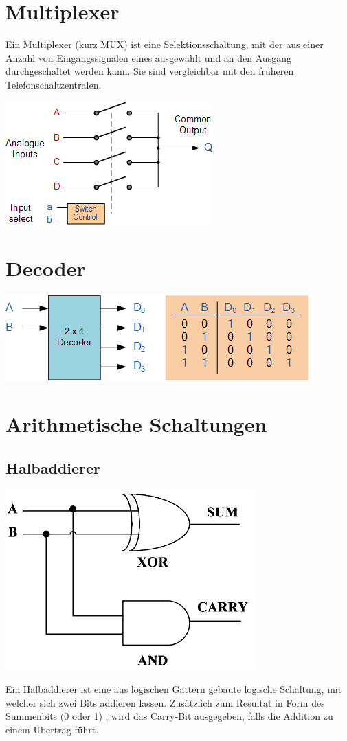 \documentclass[a4paper,10pt]{report}
\begin{document}
\section{Multiplexer}
Ein Multiplexer (kurz MUX) ist eine Selektionsschaltung, mit der aus einer Anzahl von Eingangssignalen eines ausgewählt und an den Ausgang durchgeschaltet werden kann. Sie sind vergleichbar mit den früheren Telefonschaltzentralen.
\begin{center}
\includegraphics[scale=0.9]{imgs/MUX.png}
\end{center}
\section{Decoder}
\begin{center}
\includegraphics[scale=0.75]{imgs/decoder.png}
\end{center}
\section{Arithmetische Schaltungen}
\subsection{Halbaddierer}
\begin{center}\includegraphics[scale=0.5]{imgs/halfadder.png}\end{center}
Ein Halbaddierer ist eine aus logischen Gattern gebaute logische Schaltung, mit welcher sich zwei Bits addieren lassen. Zusätzlich zum Resultat in Form des Summenbits (0 oder 1) , wird das Carry-Bit ausgegeben, falls die Addition zu einem Übertrag führt. 
\end{document}
